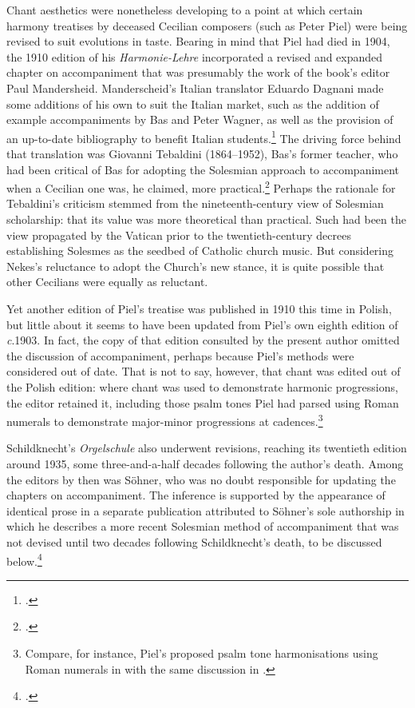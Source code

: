 Chant aesthetics were nonetheless developing to a point at which certain harmony treatises by deceased Cecilian composers (such as Peter Piel) were being revised to suit evolutions in taste.
%
Bearing in mind that Piel had died in 1904, the 1910 edition of his \emph{Harmonie-Lehre} incorporated a revised and expanded chapter on accompaniment that was presumably the work of the book's editor Paul Mandersheid.
Manderscheid's Italian translator Eduardo Dagnani made some additions of his own to suit the Italian market, such as the addition of example accompaniments by Bas and Peter Wagner, as well as the provision of an up-to-date bibliography to benefit Italian students.\footcites[256--60]{PielTrattatodicomposizione1911}[Manderscheid's editorship of the 1910 edition is not mentioned in conjunction with its entry in][p.~111 under T544]{PeroneHarmonyTheoryBibliography1997}
The driving force behind that translation was Giovanni Tebaldini (1864--1952), Bas's former teacher, who had been critical of Bas for adopting the Solesmian approach to accompaniment when a Cecilian one was, he claimed, more practical.\footcite[98]{MilaneseGiovanniTebaldiniaccompagnamento2017}
Perhaps the rationale for Tebaldini's criticism stemmed from the nineteenth-century view of Solesmian scholarship: that its value was more theoretical than practical.
Such had been the view propagated by the Vatican prior to the twentieth-century decrees establishing Solesmes as the seedbed of Catholic church music.
But considering Nekes's reluctance to adopt the Church's new stance, it is quite possible that other Cecilians were equally as reluctant.
\nowidow[2]

Yet another edition of Piel's treatise was published in 1910 this time in Polish, but little about it seems to have been updated from Piel's own eighth edition of \emph{c}.1903.
In fact, the copy of that edition consulted by the present author omitted the discussion of accompaniment, perhaps because Piel's methods were considered out of date.
That is not to say, however, that chant was edited out of the Polish edition: where chant was used to demonstrate harmonic progressions, the editor retained it, including those psalm tones Piel had parsed using Roman numerals to demonstrate major-minor progressions at cadences.\footnote{Compare, for instance, Piel's proposed psalm tone harmonisations using Roman numerals in \cite[55]{PielHarmonieLehreUnterbesonderer1903} with the same discussion in \cite[55]{PielWykladnaukiharmonii1910}.}

%
Schildknecht's \emph{Orgelschule} also underwent revisions, reaching its twentieth edition around 1935, some three-and-a-half decades following the author's death.
Among the editors by then was Söhner, who was no doubt responsible for updating the chapters on accompaniment.
The inference is supported by the appearance of identical prose in a separate publication attributed to Söhner's sole authorship in which he describes a more recent Solesmian method of accompaniment that was not devised until two decades following Schildknecht's death, to be discussed below.\footcites[140--60]{SchildknechtJosefSchildknecht1935}{SoehnerKurzeAnleitungzur1935}

